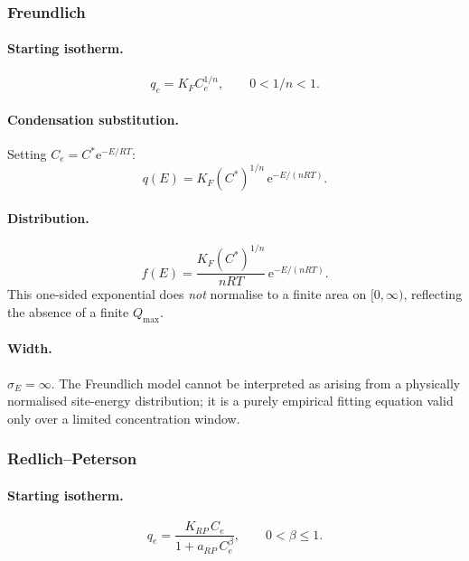 \documentclass[journal=jacsat,manuscript=article]{achemso}
\begin{document}
\subsubsection{Freundlich}

\paragraph{Starting isotherm.}
\begin{equation}
	q_e = K_F C_e^{1/n}, \qquad 0 < 1/n < 1.
\end{equation}

\paragraph{Condensation substitution.}
Setting $C_e = C^{\ast}\mathrm{e}^{-E/RT}$:
\begin{equation}
	q(E) = K_F(C^{\ast})^{1/n}\,\mathrm{e}^{-E/(nRT)}.
\end{equation}

\paragraph{Distribution.}
\begin{equation}
	f(E) = \frac{K_F(C^{\ast})^{1/n}}{nRT}\,\mathrm{e}^{-E/(nRT)}.
	\label{eq:si_fE_freundlich}
\end{equation}
This one-sided exponential does \emph{not} normalise to a finite area on
$[0,\infty)$, reflecting the absence of a finite $Q_{\max}$.

\paragraph{Width.}
$\sigma_E = \infty$. The Freundlich model cannot be interpreted as arising from
a physically normalised site-energy distribution; it is a purely empirical
fitting equation valid only over a limited concentration window.

\subsubsection{Redlich--Peterson}

\paragraph{Starting isotherm.}
\begin{equation}
	q_e = \frac{K_{RP}\,C_e}{1 + a_{RP}\,C_e^{\beta}},
	\qquad 0 < \beta \leq 1.
\end{equation}
\end{document}
